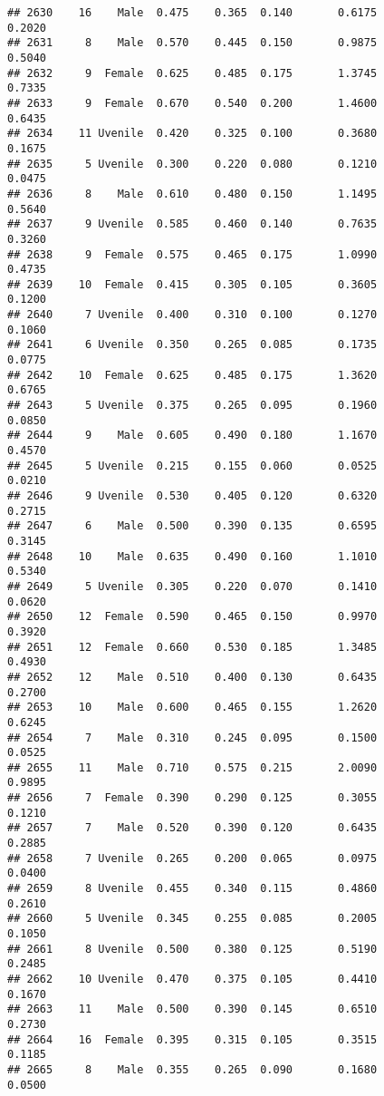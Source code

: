 \documentclass[
]{article}
\begin{document}
\begin{verbatim}
## 2630    16    Male  0.475    0.365  0.140       0.6175         0.2020
## 2631     8    Male  0.570    0.445  0.150       0.9875         0.5040
## 2632     9  Female  0.625    0.485  0.175       1.3745         0.7335
## 2633     9  Female  0.670    0.540  0.200       1.4600         0.6435
## 2634    11 Uvenile  0.420    0.325  0.100       0.3680         0.1675
## 2635     5 Uvenile  0.300    0.220  0.080       0.1210         0.0475
## 2636     8    Male  0.610    0.480  0.150       1.1495         0.5640
## 2637     9 Uvenile  0.585    0.460  0.140       0.7635         0.3260
## 2638     9  Female  0.575    0.465  0.175       1.0990         0.4735
## 2639    10  Female  0.415    0.305  0.105       0.3605         0.1200
## 2640     7 Uvenile  0.400    0.310  0.100       0.1270         0.1060
## 2641     6 Uvenile  0.350    0.265  0.085       0.1735         0.0775
## 2642    10  Female  0.625    0.485  0.175       1.3620         0.6765
## 2643     5 Uvenile  0.375    0.265  0.095       0.1960         0.0850
## 2644     9    Male  0.605    0.490  0.180       1.1670         0.4570
## 2645     5 Uvenile  0.215    0.155  0.060       0.0525         0.0210
## 2646     9 Uvenile  0.530    0.405  0.120       0.6320         0.2715
## 2647     6    Male  0.500    0.390  0.135       0.6595         0.3145
## 2648    10    Male  0.635    0.490  0.160       1.1010         0.5340
## 2649     5 Uvenile  0.305    0.220  0.070       0.1410         0.0620
## 2650    12  Female  0.590    0.465  0.150       0.9970         0.3920
## 2651    12  Female  0.660    0.530  0.185       1.3485         0.4930
## 2652    12    Male  0.510    0.400  0.130       0.6435         0.2700
## 2653    10    Male  0.600    0.465  0.155       1.2620         0.6245
## 2654     7    Male  0.310    0.245  0.095       0.1500         0.0525
## 2655    11    Male  0.710    0.575  0.215       2.0090         0.9895
## 2656     7  Female  0.390    0.290  0.125       0.3055         0.1210
## 2657     7    Male  0.520    0.390  0.120       0.6435         0.2885
## 2658     7 Uvenile  0.265    0.200  0.065       0.0975         0.0400
## 2659     8 Uvenile  0.455    0.340  0.115       0.4860         0.2610
## 2660     5 Uvenile  0.345    0.255  0.085       0.2005         0.1050
## 2661     8 Uvenile  0.500    0.380  0.125       0.5190         0.2485
## 2662    10 Uvenile  0.470    0.375  0.105       0.4410         0.1670
## 2663    11    Male  0.500    0.390  0.145       0.6510         0.2730
## 2664    16  Female  0.395    0.315  0.105       0.3515         0.1185
## 2665     8    Male  0.355    0.265  0.090       0.1680         0.0500

\end{verbatim}
\end{document}
